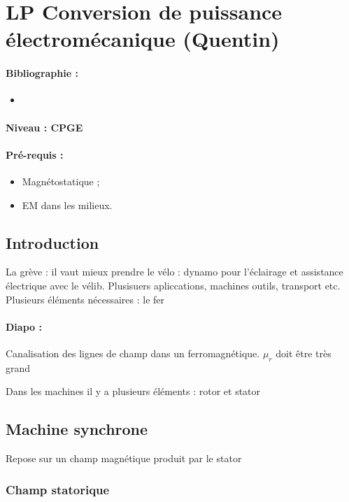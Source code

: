 \section{LP Conversion de puissance électromécanique (Quentin)}

\paragraph{Bibliographie :}
\begin{itemize}
\item 
\end{itemize}

\paragraph{Niveau : CPGE} 

\paragraph{Pré-requis :}
\begin{itemize}
\item Magnétostatique ;
\item EM dans les milieux.
\end{itemize}

\subsection{Introduction}

La grève : il vaut mieux prendre le vélo : dynamo pour l'éclairage et assistance électrique avec le vélib.
Plusisuers apliccations, machines outils, transport etc.
Plusieurs éléments nécessaires : le fer

\paragraph{Diapo : } Canalisation des lignes de champ dans un ferromagnétique.
$\mu_r$ doit être très grand

Dans les machines il y a plusieurs éléments : rotor et stator

\subsection{Machine synchrone}

Repose sur un champ magnétique produit par le stator

\subsubsection{Champ statorique}

